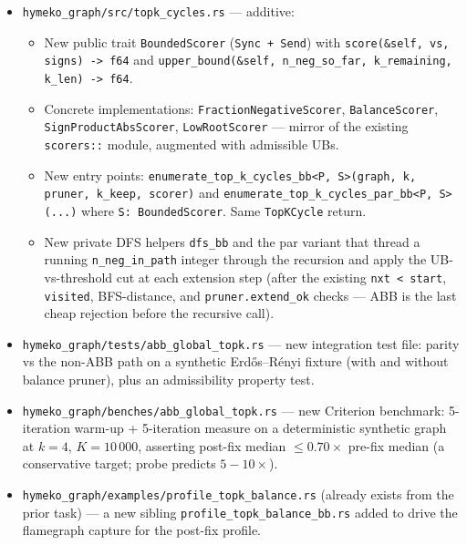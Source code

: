 \documentclass[a4paper,11pt]{article}
\begin{document}
\begin{itemize}
  \item \texttt{hymeko\_graph/src/topk\_cycles.rs} --- additive:
    \begin{itemize}
      \item New public trait \texttt{BoundedScorer} (\texttt{Sync + Send}) with
        \texttt{score(\&self, vs, signs) -> f64} and
        \texttt{upper\_bound(\&self, n\_neg\_so\_far, k\_remaining, k\_len) -> f64}.
      \item Concrete implementations:
        \texttt{FractionNegativeScorer},
        \texttt{BalanceScorer},
        \texttt{SignProductAbsScorer},
        \texttt{LowRootScorer} --- mirror of the existing
        \texttt{scorers::} module, augmented with admissible UBs.
      \item New entry points:
        \texttt{enumerate\_top\_k\_cycles\_bb<P, S>(graph, k, pruner, k\_keep, scorer)}
        and \texttt{enumerate\_top\_k\_cycles\_par\_bb<P, S>(...)}
        where \texttt{S: BoundedScorer}. Same \texttt{TopKCycle} return.
      \item New private DFS helpers \texttt{dfs\_bb} and the par variant
        that thread a running \texttt{n\_neg\_in\_path} integer through
        the recursion and apply the UB-vs-threshold cut at each
        extension step (after the existing \texttt{nxt < start},
        \texttt{visited}, BFS-distance, and \texttt{pruner.extend\_ok}
        checks --- ABB is the last cheap rejection before the recursive
        call).
    \end{itemize}
  \item \texttt{hymeko\_graph/tests/abb\_global\_topk.rs} --- new
    integration test file: parity vs the non-ABB path on a synthetic
    Erd\H{o}s--R\'enyi fixture (with and without balance pruner),
    plus an admissibility property test.
  \item \texttt{hymeko\_graph/benches/abb\_global\_topk.rs} --- new
    Criterion benchmark: 5-iteration warm-up + 5-iteration measure on
    a deterministic synthetic graph at $k{=}4$, $K{=}10\,000$,
    asserting post-fix median $\le 0.70 \times$ pre-fix median (a
    conservative target; probe predicts $5{-}10\times$).
  \item \texttt{hymeko\_graph/examples/profile\_topk\_balance.rs}
    (already exists from the prior task) --- a new sibling
    \texttt{profile\_topk\_balance\_bb.rs} added to drive the
    flamegraph capture for the post-fix profile.
\end{itemize}
\end{document}

